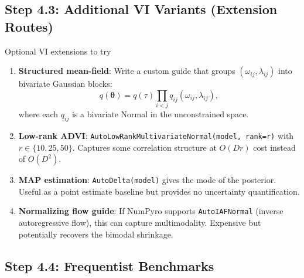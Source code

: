 \documentclass[11pt,a4paper]{article}
\begin{document}
\subsection{Step 4.3: Additional VI Variants (Extension Routes)}

\begin{action}{Optional VI extensions to try}
\begin{enumerate}
  \item \textbf{Structured mean-field}: Write a custom guide that groups $(\omega_{ij}, \lambda_{ij})$ into bivariate Gaussian blocks:
  \begin{equation}
    q(\bm{\theta}) = q(\tau) \prod_{i<j} q_{ij}(\omega_{ij}, \lambda_{ij}),
  \end{equation}
  where each $q_{ij}$ is a bivariate Normal in the unconstrained space.
  \item \textbf{Low-rank ADVI}: \texttt{AutoLowRankMultivariateNormal(model, rank=r)} with $r \in \{10, 25, 50\}$. Captures some correlation structure at $O(Dr)$ cost instead of $O(D^2)$.
  \item \textbf{MAP estimation}: \texttt{AutoDelta(model)} gives the mode of the posterior. Useful as a point estimate baseline but provides no uncertainty quantification.
  \item \textbf{Normalizing flow guide}: If NumPyro supports \texttt{AutoIAFNormal} (inverse autoregressive flow), this can capture multimodality. Expensive but potentially recovers the bimodal shrinkage.
\end{enumerate}
\end{action}

\subsection{Step 4.4: Frequentist Benchmarks}
\end{document}

